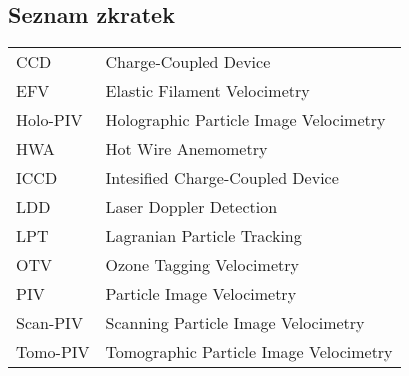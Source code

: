 \subsection*{Seznam zkratek}
    \begin{table}[ht!]
        \begin{tabular}{P{.15\textwidth}|p{.75\textwidth}}
        CCD & Charge-Coupled Device \\
        EFV & Elastic Filament Velocimetry \\
        Holo-PIV & Holographic Particle Image Velocimetry \\
        HWA & Hot Wire Anemometry \\
        ICCD & Intesified Charge-Coupled Device \\
        LDD & Laser Doppler Detection \\
        LPT & Lagranian Particle Tracking \\
        OTV & Ozone Tagging Velocimetry \\
        PIV & Particle Image Velocimetry \\
        Scan-PIV & Scanning Particle Image Velocimetry \\
        Tomo-PIV & Tomographic Particle Image Velocimetry
        \end{tabular}
    \end{table}
